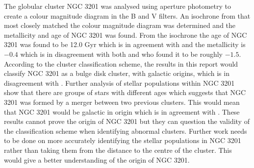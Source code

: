 \documentclass[11pt]{article}
\begin{document}
The globular cluster NGC 3201 was analysed using aperture photometry to create a colour magnitude diagram in the B and V filters. An isochrone from \citet{iso} that most closely matched the colour magnitude diagram was determined and the metallicity and age of NGC 3201 was found. From the isochrone the age of NGC 3201 was found to be 12.0 Gyr which is in agreement with \citet{Layden_2003} and the metallicity is $-0.4$ which is in disagreement with both \citet{Layden_2003} and \citet{Mackey} who found it to be roughly $-1.5$. According to the \citet{Mackey} cluster classification scheme, the results in this report would classify NGC 3201 as a bulge disk cluster, with galactic origins, which is in disagreement with \citet{Mackey}. Further analysis of stellar populations within NGC 3201 show that there are groups of stars with different ages which suggests that NGC 3201 was formed by a merger between two previous clusters. This would mean that NGC 3201 would be galactic in origin which is in agreement with \citet{god}. These results cannot prove the origin of NGC 3201 but they can question the validity of the \citet{Mackey} classification scheme when identifying abnormal clusters. Further work needs to be done on more accurately identifying the stellar populations in NGC 3201 rather than taking them from the distance to the centre of the cluster. This would give a better understanding of the origin of NGC 3201. 

\pagebreak


\end{document}
